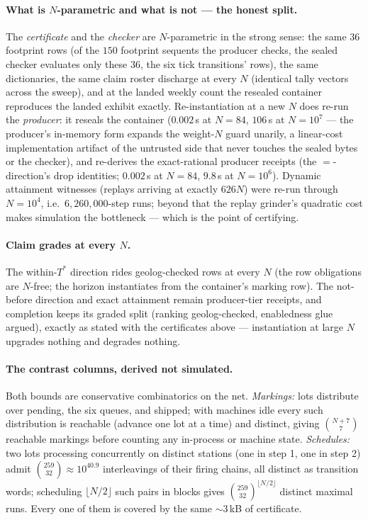 \paragraph{What is $N$-parametric and what is not --- the honest
split.} The \emph{certificate} and the \emph{checker} are
$N$-parametric in the strong sense: the same $36$ footprint rows
(of the $150$ footprint sequents the producer checks, the sealed
checker evaluates only these $36$, the six tick transitions' rows),
the same dictionaries, the same claim roster discharge at every $N$
(identical tally vectors across the sweep), and at the landed weekly
count the resealed container reproduces the landed exhibit exactly.
Re-instantiation at a new $N$ does re-run the \emph{producer}: it
reseals the container ($0.002$\,s at $N=84$, $106$\,s at $N=10^{7}$
--- the producer's in-memory form expands the weight-$N$ guard
unarily, a linear-cost implementation artifact of the untrusted
side that never touches the sealed bytes or the checker), and
re-derives the exact-rational producer receipts (the
$=$-direction's drop identities; $0.002$\,s at $N=84$, $9.8$\,s at
$N=10^{6}$). Dynamic attainment witnesses (replays arriving at
exactly $626N$) were re-run through $N=10^{4}$, i.e.\
$6{,}260{,}000$-step runs; beyond that the replay grinder's
quadratic cost makes simulation the bottleneck --- which is the
point of certifying.

\paragraph{Claim grades at every $N$.} The within-$T^{*}$ direction
rides geolog-checked rows at every $N$ (the row obligations are
$N$-free; the horizon instantiates from the container's marking
row). The not-before direction and exact attainment remain
producer-tier receipts, and completion keeps its graded split
(ranking geolog-checked, enabledness glue argued), exactly as stated with the
certificates above --- instantiation at large $N$ upgrades nothing
and degrades nothing.

\paragraph{The contrast columns, derived not simulated.} Both
bounds are conservative combinatorics on the net. \emph{Markings:}
lots distribute over pending, the six queues, and shipped; with
machines idle every such distribution is reachable (advance one lot
at a time) and distinct, giving $\binom{N+7}{7}$ reachable markings
before counting any in-process or machine state. \emph{Schedules:}
two lots processing concurrently on distinct stations (one in step
1, one in step 2) admit $\binom{259}{32} \approx 10^{40.9}$
interleavings of their firing chains, all distinct as transition
words; scheduling $\lfloor N/2\rfloor$ such pairs in blocks gives
$\binom{259}{32}^{\lfloor N/2\rfloor}$ distinct maximal runs. Every
one of them is covered by the same $\sim$3\,kB of certificate.

